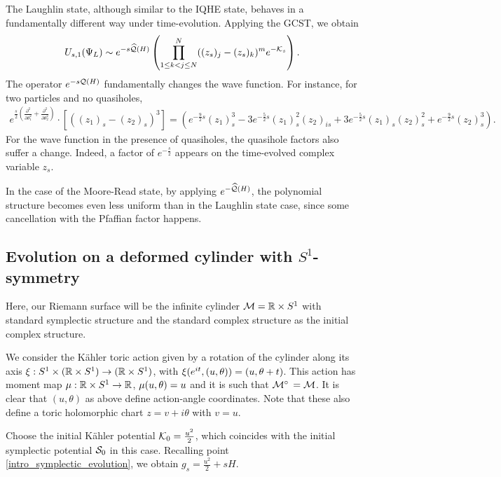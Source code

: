 \documentclass[notas.tex]{subfiles} 				%
\begin{document}
The Laughlin state, although similar to the IQHE state, behaves in a fundamentally different way under time-evolution. Applying the GCST, we obtain
\begin{align*} U_{s,1}(\Psi_{L}) \sim e^{-s\widehat{\mathcal{Q}}(H)} \left ( \prod_{1 \leq k < j \leq N}^N((z_{s})_j - (z_{s})_k)^m e^{-\mathcal{K}_s}\right ).
\end{align*}
The operator $e^{-s\mathcal{Q}(H)}$ fundamentally changes the wave function. For instance, for two particles and no quasiholes, 
\begin{align*}
e^{\frac{s}{2}\left (\frac{\partial^2}{\partial \theta_1^2} + \frac{\partial^2}{\partial \theta_2^2} \right )} \cdot \left [ ((z_1)_{s} - (z_2)_{s})^3 \right ] 
= \left ( e^{-\frac{9}{2}s} (z_1)_{s}^3 - 3 e^{-\frac{5}{2}s} (z_1)^2_{s}(z_2)_{is} +  3 e^{-\frac{5}{2}s} (z_1)_{s}(z_2)^2_{s} + e^{-\frac{9}{2}s} (z_2)_{s}^3\right ).
\end{align*}
For the wave function in the presence of quasiholes, the quasihole factors also suffer a change. Indeed, a factor of $e^{-\frac{s}{2}}$ appears on the time-evolved complex variable $z_{s}$.

In the case of the Moore-Read state, by applying $e^{- \widehat {\mathcal{Q}}(H)}$, the polynomial structure becomes even less uniform than in the Laughlin state case, since some cancellation with the Pfaffian factor happens.

\subsection{Evolution on a deformed cylinder with $S^1$-symmetry} \label{sec_cyl}
Here, our Riemann surface will be the infinite cylinder $\mathcal{M} = \mathbb{R} \times S^1$ with standard symplectic structure and the standard complex structure as the initial complex structure.

We consider the Kähler toric action given by a rotation of the cylinder along its axis $	\xi: S^1 \times (\mathbb{R} \times S^1) \to (\mathbb{R} \times S^1)$, with $\xi(e^{it}, (u,\theta)) = (u, \theta + t)$. This action has moment map $\mu: \mathbb{R} \times S^1 \to \mathbb{R}$, $\mu(u, \theta) = u$ and it is such that $\mfld^\circ = \mfld$. It is clear that $(u, \theta)$ as above define action-angle coordinates. Note that these also define a toric holomorphic chart $z = v + i\theta$ with $v = u$.

Choose the initial Kähler potential $\mathcal{K}_0 = \frac{u^2}{2}$, which coincides with the initial symplectic potential $\mathcal{S}_0$ in this case. Recalling point \eqref{intro_symplectic_evolution}, we obtain $g_{s} = \frac{u^2}{2} + sH$.
\end{document}
